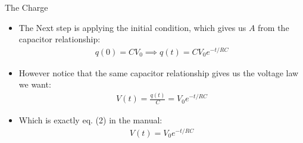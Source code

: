 \documentclass{beamer}
\begin{document}
\begin{frame}{The Charge}
  \begin{itemize}
  \item The Next step is applying the initial condition, which gives us $A$ from the capacitor relationship:
    \begin{align*}
      q(0)=CV_0\implies q(t)=CV_0e^{-t/RC}
    \end{align*}
  \item However notice that the same capacitor relationship gives us the voltage law we want:
    \begin{align*}
      V(t)=\frac{q(t)}{C}=V_0e^{-t/RC}
    \end{align*}
  \item Which is exactly eq. (2) in the manual:
    \begin{align*}
      \boxed{V(t)=V_0e^{-t/RC}}
    \end{align*}
  \end{itemize}
\end{frame}
\end{document}
